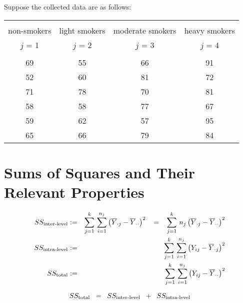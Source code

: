\documentclass{article}
\begin{document}
\noindent
Suppose the collected data are as follows:
\begin{center}
\begin{tabular}{|c|c|c|c|}
\hline
&&&\\
non-smokers & light smokers & moderate smokers & heavy smokers \\
$j$ = 1&$j$ = 2&$j$ = 3&$j$ = 4\\
&&&\\
\hline
69 & 55 & 66 & 91 \\
52 & 60 & 81 & 72 \\
71 & 78 & 70 & 81 \\
58 & 58 & 77 & 67 \\
59 & 62 & 57 & 95 \\
65 & 66 & 79 & 84 \\
\hline
\end{tabular}
\end{center}


\section{Sums of Squares and Their Relevant Properties}
\setcounter{theorem}{0}

\begin{eqnarray*}
SS_{\textnormal{inter-level}}
& := & \sum^{k}_{j=1}\,\sum^{n_{j}}_{i=1}\left(\overline{Y}_{\cdot j} - \overline{Y}_{\cdot\cdot}\right)^{2}
\;\;\; = \;\;\; \sum^{k}_{j=1}\,n_{j}\left(\overline{Y}_{\cdot j} - \overline{Y}_{\cdot\cdot}\right)^{2} \\
SS_{\textnormal{intra-level}}
& := & \sum^{k}_{j=1}\,\sum^{n_{j}}_{i=1}\left(Y_{ij} - \overline{Y}_{\cdot j}\right)^{2} \\
SS_{\textnormal{total}}
& := & \sum^{k}_{j=1}\,\sum^{n_{j}}_{i=1}\left(Y_{ij} - \overline{Y}_{\cdot\cdot}\right)^{2} \\
\end{eqnarray*}

\begin{proposition}
\begin{equation*}
SS_{\textnormal{total}} \;\; = \;\; SS_{\textnormal{inter-level}} \;\; + \;\; SS_{\textnormal{intra-level}}
\end{equation*}
\end{proposition}
\end{document}
